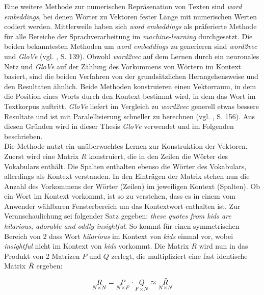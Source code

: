 \documentclass[a4paper,11pt]{article}
\begin{document}
Eine weitere Methode zur numerischen Repräsenation von Texten sind \textit{word embeddings}, bei denen Wörter zu Vektoren fester Länge mit numerischen Werten codiert werden. Mittlerweile haben sich \textit{word embeddings} als präferierte Methode für alle Bereiche der Sprachverarbeitung im \textit{machine-learning} durchgesetzt. Die beiden bekanntesten Methoden um \textit{word embeddings} zu generieren sind \textit{word2vec} und \textit{GloVe} (vgl. \cite{keras}, S. 139). Obwohl \textit{word2vec} auf dem Lernen durch ein neuronales Netz und \textit{GloVe} auf der Zählung des Vorkommens von Wörtern im Kontext basiert, sind die beiden Verfahren von der grundsätzlichen Herangehensweise und den Resultaten ähnlich. Beide Methoden konstruieren einen Vektorraum, in dem die Position eines Worts durch den Kontext bestimmt wird, in dem das Wort im Textkorpus auftritt.
\textit{GloVe} liefert im Vergleich zu \textit{word2vec} generell etwas bessere Resultate und ist mit Paralellisierung schneller zu berechnen (vgl. \cite{keras}, S. 156). Aus diesen Gründen wird in dieser Thesis \textit{GloVe} verwendet und im Folgenden beschrieben. \\
Die Methode nutzt ein unüberwachtes Lernen zur Konstruktion der Vektoren. Zuerst wird eine Matrix $R$ konstruiert, die in den Zeilen die Wörter des Vokabulars enthält. Die Spalten enthalten ebenso die Wörter des Vokabulars, allerdings als Kontext verstanden. In den Einträgen der Matrix stehen nun die Anzahl des Vorkommens der Wörter (Zeilen) im jeweiligen Kontext (Spalten). Ob ein Wort im Kontext vorkommt, ist so zu verstehen, dass es in einem vom Anwender wählbaren Fensterbereich um das Kontextwort enthalten ist. Zur Veranschaulichung sei folgender Satz gegeben: \textit{these quotes from kids are hilarious, adorable and oddly insightful}. So kommt für einen symmetrischen Bereich von $2$ dass Wort \textit{hilarious} im Kontext von \textit{kids} einmal vor, wobei \textit{insightful} nicht im Kontext von \textit{kids} vorkommt. 
Die Matrix $R$ wird nun in das Produkt von 2 Matrizen $P$ und $Q$ zerlegt, die multipliziert eine fast identische Matrix $\Tilde{R}$ ergeben:

\begin{equation*}
\underset{N \times N}{R} = \underset{N \times F}{P} \cdot \underset{F \times N}{Q} \approx  \underset{N \times N}{\Tilde{R}} 
\end{equation*}
\end{document}
